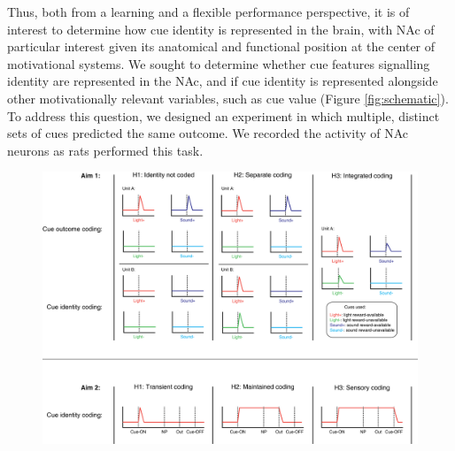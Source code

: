 \documentclass[11pt]{article}
\begin{document}
Thus, both from a learning and a flexible performance perspective, it is of interest to determine how cue identity is represented in the brain, with NAc of particular interest given its anatomical and functional position at the center of motivational systems. We sought to determine whether cue features signalling identity are represented in the NAc, and if cue identity is represented alongside other motivationally relevant variables, such as cue value (Figure \ref{fig:schematic}). To address this question, we designed an experiment in which multiple, distinct sets of cues predicted the same outcome. We recorded the activity of NAc neurons as rats performed this task. 

\begin{figure}[h]
\centering
\includegraphics[width=\textwidth]{Fig 1 - Schematic neural.png}

\end{figure}
\end{document}

